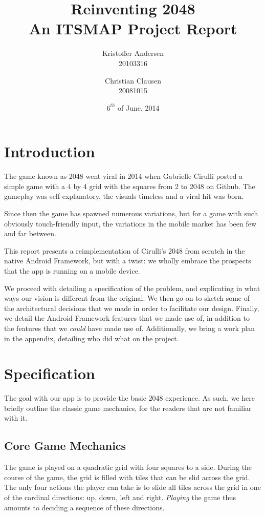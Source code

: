 \documentclass[a4paper, 12pt]{article}
\title{Reinventing 2048\\\large{An ITSMAP Project Report}}
\author{Kristoffer Andersen\\\large{20103316} \and
Christian Clausen \\ \large{20081015}}
\date{$6^{th}$ of June, 2014}
\begin{document}
\maketitle
\nonumber
\newpage
\tableofcontents
\newpage
\section{Introduction}
The game known as 2048 went viral in 2014 when Gabrielle Cirulli
posted a simple game with a 4 by 4 grid with the squares from 2 to
2048 on Github. The gameplay was self-explanatory, the visuals
timeless and a viral hit was born.

Since then the game has spawned numerous variations, but for a game
with such obviously touch-friendly input, the variations in the mobile
market has been few and far between.

This report presents a reimplementation of Cirulli's 2048 from scratch
in the native Android Framework, but with a twist: we wholly embrace
the prospects that the app is running on a mobile device.

We proceed with detailing a specification of the problem, and
explicating in what ways our vision is different from the original. We
then go on to sketch some of the architectural decisions that we made
in order to facilitate our design. Finally, we detail the Android
Framework features that we made use of, in addition to the features
that we \emph{could} have made use of. Additionally, we bring a work
plan in the appendix, detailing who did what on the project.

\section{Specification}
The goal with our app is to provide the basic 2048 experience. As
such, we here briefly outline the classic game mechanics, for the
readers that are not familiar with it.

\subsection{Core Game Mechanics}

The game is played on a quadratic grid with four squares to a
side. During the course of the game, the grid is filled with tiles
that can be slid across the grid. The only four actions the player can
take is to slide all tiles across the grid in one of the cardinal
directions: up, down, left and right. \emph{Playing} the game thus
amounts to deciding a sequence of these directions.
\end{document}
